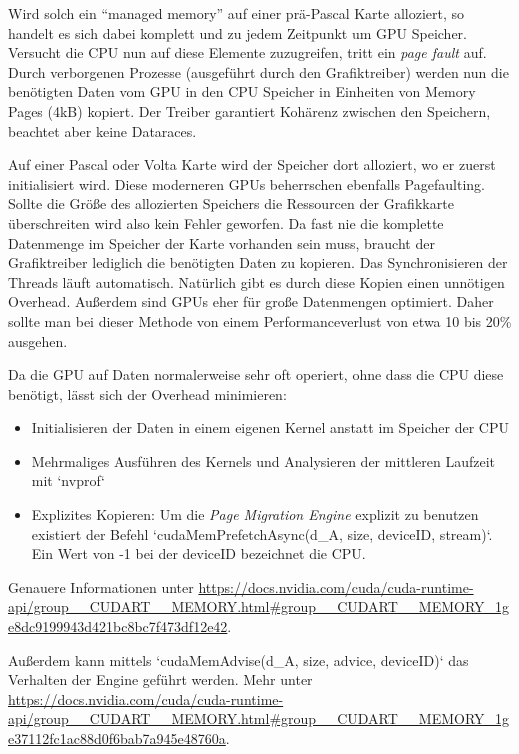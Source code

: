 		\bigskip
		
		Wird solch ein \enquote{managed memory} auf einer prä-Pascal Karte alloziert, so handelt es sich dabei komplett und zu jedem Zeitpunkt um GPU Speicher. Versucht die CPU nun auf diese Elemente zuzugreifen, tritt ein \textit{page fault} auf. Durch verborgenen Prozesse (ausgeführt durch den Grafiktreiber) werden nun die benötigten Daten vom GPU in den CPU Speicher in Einheiten von Memory Pages (4kB) kopiert. Der Treiber garantiert Kohärenz zwischen den Speichern, beachtet aber keine Dataraces.
		
		Auf einer Pascal oder Volta Karte wird der Speicher dort alloziert, wo er zuerst initialisiert wird. Diese moderneren GPUs beherrschen ebenfalls Pagefaulting. Sollte die Größe des allozierten Speichers die Ressourcen der Grafikkarte überschreiten wird also kein Fehler geworfen. Da fast nie die komplette Datenmenge im Speicher der Karte vorhanden sein muss, braucht der Grafiktreiber lediglich die benötigten Daten zu kopieren. Das Synchronisieren der \Glspl{Thread} läuft automatisch. Natürlich gibt es durch diese Kopien einen unnötigen Overhead. Außerdem sind GPUs eher für große Datenmengen optimiert. Daher sollte man bei dieser Methode von einem Performanceverlust von etwa 10 bis 20\% ausgehen. 
		
		Da die GPU auf Daten normalerweise sehr oft operiert, ohne dass die CPU diese benötigt, lässt sich der Overhead minimieren:
		\begin{itemize}
		    \item Initialisieren der Daten in einem eigenen \Gls{Kernel} anstatt im Speicher der CPU
		    \item Mehrmaliges Ausführen des \Gls{Kernel}s und Analysieren der mittleren Laufzeit mit \li`nvprof`
	    	    \item Explizites Kopieren: Um die \textit{Page Migration Engine} explizit zu benutzen existiert der Befehl \li`cudaMemPrefetchAsync(d_A, size, deviceID, stream)`. Ein Wert von -1 bei der deviceID bezeichnet die CPU.
		\end{itemize}
		Genauere Informationen unter \url{https://docs.nvidia.com/cuda/cuda-runtime-api/group__CUDART__MEMORY.html#group__CUDART__MEMORY_1ge8dc9199943d421bc8bc7f473df12e42}.
		
		Außerdem kann mittels \li`cudaMemAdvise(d_A, size, advice, deviceID)` das Verhalten der Engine geführt werden. Mehr unter \url{https://docs.nvidia.com/cuda/cuda-runtime-api/group__CUDART__MEMORY.html#group__CUDART__MEMORY_1ge37112fc1ac88d0f6bab7a945e48760a}.

